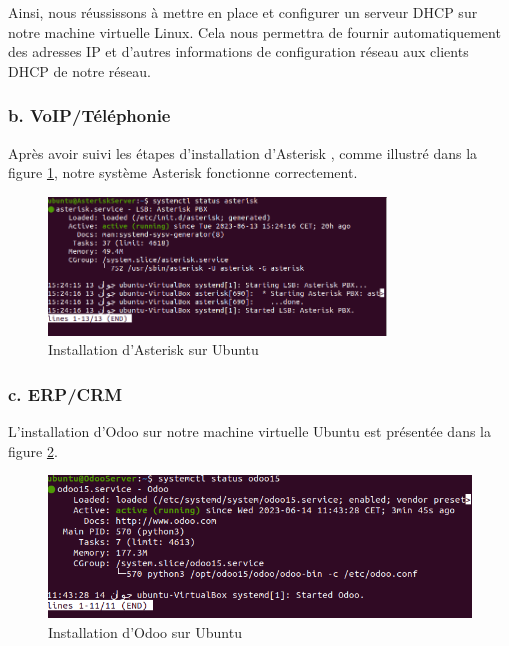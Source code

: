 Ainsi, nous réussissons  à mettre en place et configurer un serveur DHCP sur notre machine virtuelle Linux. Cela nous permettra de fournir automatiquement des adresses IP et d'autres informations de configuration réseau aux clients DHCP de notre réseau.

\subsubsection{b. VoIP/Téléphonie}

Après avoir suivi les étapes d'installation d'Asterisk \cite{asterisk-install-vegastack}, comme illustré dans la figure \ref{fig:asterisk-server1}, notre système Asterisk fonctionne correctement.

\begin{figure}[H]
    \centering
    \includegraphics[width=0.8\textwidth]{Images/AsteriskServer1.png}
    \caption{Installation d'Asterisk sur Ubuntu}
    \label{fig:asterisk-server1}
\end{figure}


\subsubsection{c. ERP/CRM}

L'installation d'Odoo \cite{odoo16-ubuntu-install} sur notre machine virtuelle Ubuntu est présentée dans la figure \ref{fig:odoo-installation}.

\begin{figure}[H]
\centering
\includegraphics[width=15cm]{Images/OdooServer1.png}
\caption{Installation d'Odoo sur Ubuntu}
\label{fig:odoo-installation}
\end{figure}

